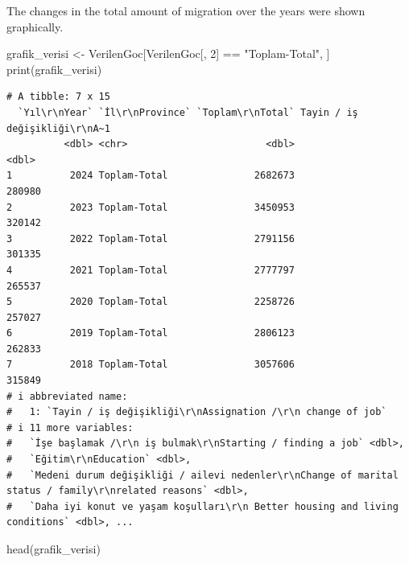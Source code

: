 \documentclass[
  11pt,
  a4paper,
  DIV=11,
  numbers=noendperiod]{scrartcl}
\newenvironment{Shaded}{\begin{snugshade}}{\end{snugshade}}
\newcommand{\DecValTok}[1]{\textcolor[rgb]{0.68,0.00,0.00}{#1}}
\newcommand{\FunctionTok}[1]{\textcolor[rgb]{0.28,0.35,0.67}{#1}}
\newcommand{\NormalTok}[1]{\textcolor[rgb]{0.00,0.23,0.31}{#1}}
\newcommand{\OtherTok}[1]{\textcolor[rgb]{0.00,0.23,0.31}{#1}}
\newcommand{\SpecialCharTok}[1]{\textcolor[rgb]{0.37,0.37,0.37}{#1}}
\newcommand{\StringTok}[1]{\textcolor[rgb]{0.13,0.47,0.30}{#1}}
\begin{document}
The changes in the total amount of migration over the years were shown
graphically.

\begin{Shaded}
\begin{Highlighting}[]
\NormalTok{grafik\_verisi }\OtherTok{\textless{}{-}}\NormalTok{ VerilenGoc[VerilenGoc[, }\DecValTok{2}\NormalTok{] }\SpecialCharTok{==} \StringTok{"Toplam{-}Total"}\NormalTok{, ]}
\FunctionTok{print}\NormalTok{(grafik\_verisi)}
\end{Highlighting}
\end{Shaded}

\begin{verbatim}
# A tibble: 7 x 15
  `Yıl\r\nYear` `İl\r\nProvince` `Toplam\r\nTotal` Tayin / iş değişikliği\r\nA~1
          <dbl> <chr>                        <dbl>                         <dbl>
1          2024 Toplam-Total               2682673                        280980
2          2023 Toplam-Total               3450953                        320142
3          2022 Toplam-Total               2791156                        301335
4          2021 Toplam-Total               2777797                        265537
5          2020 Toplam-Total               2258726                        257027
6          2019 Toplam-Total               2806123                        262833
7          2018 Toplam-Total               3057606                        315849
# i abbreviated name:
#   1: `Tayin / iş değişikliği\r\nAssignation /\r\n change of job`
# i 11 more variables:
#   `İşe başlamak /\r\n iş bulmak\r\nStarting / finding a job` <dbl>,
#   `Eğitim\r\nEducation` <dbl>,
#   `Medeni durum değişikliği / ailevi nedenler\r\nChange of marital status / family\r\nrelated reasons` <dbl>,
#   `Daha iyi konut ve yaşam koşulları\r\n Better housing and living conditions` <dbl>, ...
\end{verbatim}

\begin{Shaded}
\begin{Highlighting}[]
\FunctionTok{head}\NormalTok{(grafik\_verisi)}
\end{Highlighting}
\end{Shaded}
\end{document}
